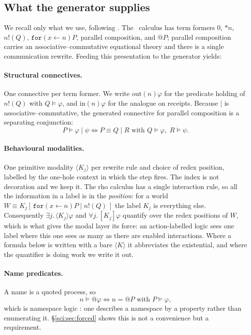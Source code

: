 \subsection{What the generator supplies}\label{sci:S3.1}

We recall only what we use, following \cite[\S2]{ClassifierNote}. The \rhoc\ calculus has term formers
$0$, $\ast n$, $n!(Q)$, $\texttt{for}(x \leftarrow n)P$, parallel composition, and $@P$; parallel
composition carries an associative--commutative equational theory and there is a single communication
rewrite. Feeding this presentation to the generator yields:

\paragraph{Structural connectives.} One connective per term former. We write $\mathrm{out}(n)\varphi$
for the predicate holding of $n!(Q)$ with $Q \models \varphi$, and $\mathrm{in}(n)\varphi$ for the
analogue on receipts. Because $\mid$ is associative--commutative, the generated connective for
parallel composition is a separating conjunction:
\[
P \models \varphi \mid \psi \iff P \equiv Q \mid R \text{ with } Q \models \varphi,\; R \models \psi .
\]

\paragraph{Behavioural modalities.} One primitive modality $\langle K_j \rangle$ per rewrite rule and
choice of redex position, labelled by the one-hole context in which the step fires. The index is not
decoration and we keep it. The rho calculus has a single interaction rule, so all the information in
a label is in the \emph{position}: for a world $W \equiv K_j[\,\texttt{for}(x \leftarrow n)P \mid
n!(Q)\,]$ the label $K_j$ is everything else. Consequently $\exists j.\,\langle K_j\rangle\varphi$
and $\forall j.\,[K_j]\varphi$ quantify over the redex positions of $W$, which is what gives the
modal layer its force: an action-labelled logic sees one label where this one sees as many as there
are enabled interactions. Where a formula below is written with a bare $\langle K\rangle$ it
abbreviates the existential, and where the quantifier is doing work we write it out.

\paragraph{Name predicates.} A name is a quoted process, so
\[
n \models @\varphi \iff n = @P \text{ with } P \models \varphi ,
\]
which is namespace logic \cite{NamespaceLogic}: one describes a namespace by a property rather than
enumerating it. \S\ref{sci:sec:forced} shows this is not a convenience but a requirement.

